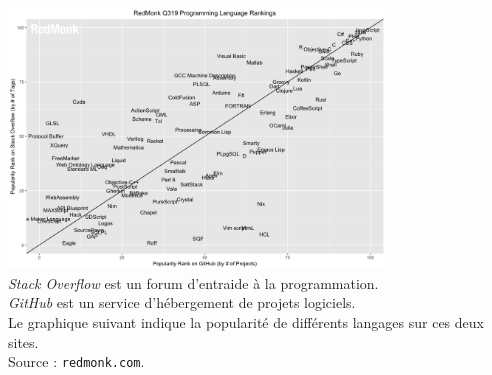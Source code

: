 \documentclass[10pt]{beamer}
\begin{document}
\begin{frame}
\begin{center}
	\includegraphics[width=10cm]{rank.png}\\ \scriptsize	\textit{Stack Overflow} est un forum d'entraide à la programmation.\\ \textit{GitHub} est un service d'hébergement de projets logiciels.\\
	Le graphique suivant indique la popularité de différents langages sur ces deux sites.\\
	Source : \texttt{redmonk.com}.
\end{center}
\end{frame}
\end{document}
